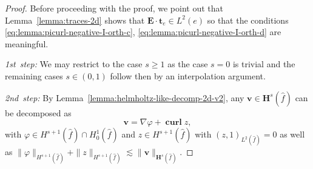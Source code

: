 \documentclass{article}
\newcommand\neu[1]{{\color{red}#1}}
\begin{document}
\begin{proof}
%
Before proceeding with the proof, we point out that Lemma~\ref{lemma:traces-2d} shows that 
${\mathbf E} \cdot {\mathbf t}_e \in L^2(e)$ so that the 
conditions \eqref{eq:lemma:picurl-negative-I-orth-c}, \eqref{eq:lemma:picurl-negative-I-orth-d} 
 are meaningful. 

\emph{1st~step:} 
We may restrict to the case $s \ge 1$ as the case $s = 0$ is trivial and the 
remaining cases $s \in (0,1)$ follow then by an interpolation argument.

\emph{2nd~step:} By Lemma~\ref{lemma:helmholtz-like-decomp-2d-v2}, 
any ${\mathbf{v}}\in{\mathbf{H}}^{s}(\widehat{f})$ can be decomposed as
\begin{equation}
{\mathbf{v}}=\nabla\varphi+\operatorname{\mathbf{curl}}z,
\label{eq:lemma:picurl-negative-I-10}%
\end{equation}
with $\varphi \in H^{s+1}(\widehat{f}) \cap H^1_0(\widehat{f})$ and 
$z\in H^{s+1}(\widehat{f})$ with $(z,1)_{L^2(\widehat f)} = 0$ 
as well as $\|\varphi\|_{H^{s+1}(\widehat{f})} + 
\|z\|_{H^{s+1}(\widehat{f})} \lesssim \|{\mathbf v}\|_{{\mathbf H}^s(\widehat f)}$. 

\end{proof}
\end{document}
